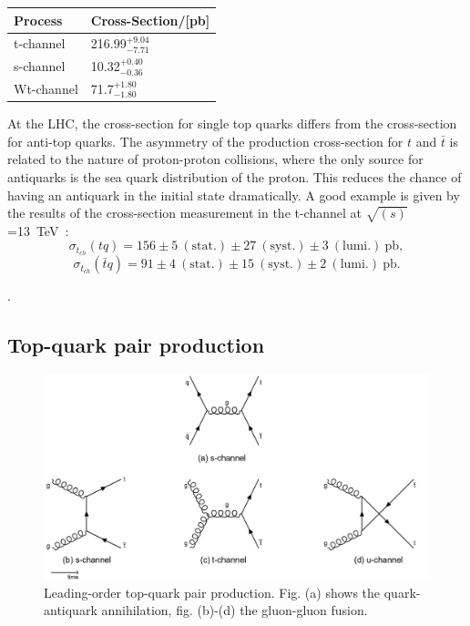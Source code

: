\begin{center}
	\label{tab:T23}
	
	
	\vspace{0.3cm}	
	
	
\begin{tabular}{>{}m{4.0cm}>{}m{4.0cm}} \toprule
		
		Process& Cross-Section/[pb] \\
		
		\midrule
		t-channel	&216.99$^{+9.04}_{-7.71}$\\
		s-channel	&10.32$^{+0.40}_{-0.36}$\\
		Wt-channel	&71.7$^{+1.80}_{-1.80}$\\
		
		\bottomrule
	\end{tabular}
	
\end{center}


\noindent At the LHC, the cross-section for single top quarks differs from the cross-section for anti-top quarks. The asymmetry of the production cross-section for $t$  and $\bar{t}$ is related to the nature of proton-proton collisions, where the only source for antiquarks is the sea quark distribution of the proton. This reduces the chance of having an antiquark in the initial state dramatically. A good example is given by the results of the cross-section measurement in the t-channel at $\sqrt{(s)}$=13~TeV~\cite{Aaboud:2016ymp}: 
\begin{equation*}
\sigma_ {t_{ch}}(tq)= 156\pm 5~(\text{stat.})\pm 27~(\text{syst.}) \pm 3~(\text{lumi}.)~\text{pb}, 
\end{equation*}
\begin{equation*}
\sigma_ {t_{ch}}(\bar{t}q)= 91\pm 4~(\text{stat.})\pm 15~(\text{syst.}) \pm 2~(\text{lumi}.)~\text{pb}.
\end{equation*}

 

.   


\subsection{Top-quark pair production}
\begin{figure}[h]
	\centering
	\includegraphics[width=0.70\linewidth]{Pics/cp1/ttbar}
	\caption{Leading-order top-quark pair production. Fig. (a) shows the quark- antiquark annihilation, fig. (b)-(d)  the gluon-gluon fusion.} 
	\label{fig:ttbar}
\end{figure}




